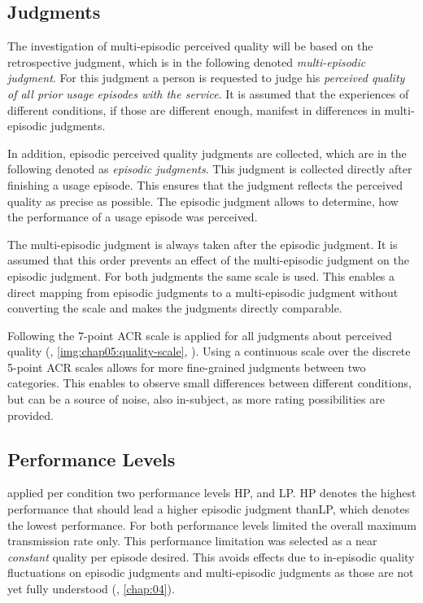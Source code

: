 \subsection{Judgments}
The investigation of multi-episodic perceived quality will be based on the retrospective judgment, which is in the following denoted \emph{multi-episodic judgment}.
For this judgment a person is requested to judge his \emph{perceived quality of all prior usage episodes with the service}.
It is assumed that the experiences of different conditions, if those are different enough, manifest in differences in multi-episodic judgments.

In addition, episodic perceived quality judgments are collected, which are in the following denoted as \emph{episodic judgments}.
This judgment is collected directly after finishing a usage episode.
This ensures that the judgment reflects the perceived quality as precise as possible.
The episodic judgment allows to determine, how the performance of a usage episode was perceived.

The multi-episodic judgment is always taken after the episodic judgment.
It is assumed that this order prevents an effect of the multi-episodic judgment on the episodic judgment.
For both judgments the same scale is used.
This enables a direct mapping from episodic judgments to a multi-episodic judgment without converting the scale and makes the judgments directly comparable.

Following \cite{moller_single-call_2011} the 7-point \ac{ACR} scale is applied for all judgments about perceived quality (\cf, \autoref{img:chap05:quality-scale}, ).
Using a continuous scale over the discrete 5-point \ac{ACR} scales allows for more fine-grained judgments between two categories.
This enables to observe small differences between different conditions, but can be a source of noise, also in-subject, as more rating possibilities are provided.

\subsection{Performance Levels}
\cite{moller_single-call_2011} applied per condition two performance levels \acf{HP}, and \acf{LP}.
\ac{HP} denotes the highest performance that should lead a higher episodic judgment than\ac{LP}, which denotes the lowest performance.
For both performance levels \cite{moller_single-call_2011} limited the overall maximum transmission rate only.
This performance limitation was selected as a near \emph{constant} quality per episode desired. %
This avoids effects due to in-episodic quality fluctuations on episodic judgments and multi-episodic judgments as those are not yet fully understood (\cf, \autoref{chap:04}).

